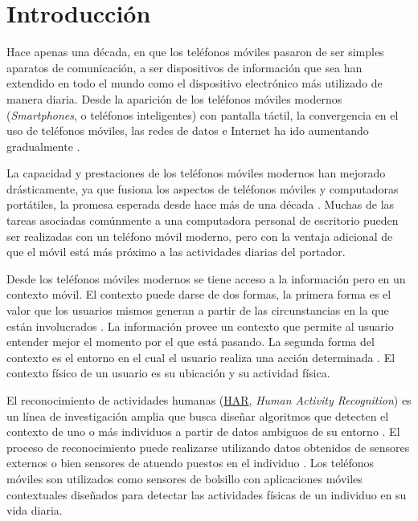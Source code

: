
\chapter{Introducción}

\label{chap:introduccion}

Hace apenas una década, en que los teléfonos móviles pasaron de ser
simples aparatos de comunicación, a ser dispositivos de información
que sea han extendido en todo el mundo como el dispositivo electrónico
más utilizado de manera diaria. Desde la aparición de los teléfonos
móviles modernos (\emph{Smartphones}, o teléfonos inteligentes) con
pantalla táctil, la convergencia en el uso de teléfonos móviles, las
redes de datos e Internet ha ido aumentando gradualmente \cite{fling2009mobile}.

La capacidad y prestaciones de los teléfonos móviles modernos han
mejorado drásticamente, ya que fusiona los aspectos de teléfonos móviles
y computadoras portátiles, la promesa esperada desde hace más de una
década \cite{Tanenbaum2010}. Muchas de las tareas asociadas comúnmente
a una computadora personal de escritorio pueden ser realizadas con
un teléfono móvil moderno, pero con la ventaja adicional de que el
móvil está más próximo a las actividades diarias del portador.

Desde los teléfonos móviles modernos se tiene acceso a la información
pero en un contexto móvil. El contexto puede darse de dos formas,
la primera forma es el valor que los usuarios mismos generan a partir
de las circunstancias en la que están involucrados \cite{fling2009mobile}.
La información provee un contexto que permite al usuario entender
mejor el momento por el que está pasando. La segunda forma del contexto
es el entorno en el cual el usuario realiza una acción determinada
\cite{fling2009mobile}. El contexto físico de un usuario es su ubicación
y su actividad física. 

El reconocimiento de actividades humanas (\hyperlink{abbr}{HAR},
\emph{Human Activity Recognition}) es un línea de investigación amplia
que busca diseñar algoritmos que detecten el contexto de uno o más
individuos a partir de datos ambiguos de su entorno \cite{Bao2004}.
El proceso de reconocimiento puede realizarse utilizando datos obtenidos
de sensores externos o bien sensores de atuendo puestos en el individuo
\cite{LaraLabrador2013}. Los teléfonos móviles son utilizados como
sensores de bolsillo con aplicaciones móviles contextuales diseñados
para detectar las actividades físicas de un individuo en su vida diaria. 

